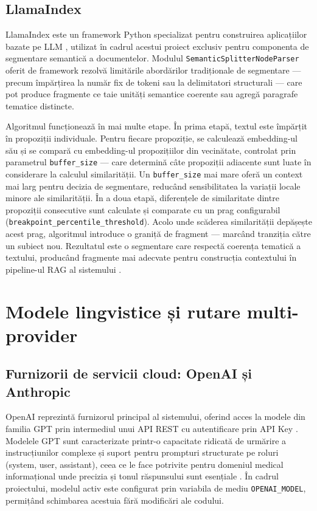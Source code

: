 \documentclass[12pt, a4paper, oneside, romanian]{teza-upb}
\begin{document}
\subsection{LlamaIndex}

LlamaIndex este un framework Python specializat pentru construirea aplicațiilor 
bazate pe LLM \cite{llamaindex_doc}, utilizat în cadrul acestui proiect exclusiv 
pentru componenta de segmentare semantică a documentelor. Modulul 
\texttt{SemanticSplitterNodeParser} oferit de framework rezolvă limitările 
abordărilor tradiționale de segmentare — precum împărțirea la număr fix de 
tokeni sau la delimitatori structurali — care pot produce fragmente ce taie 
unități semantice coerente sau agregă paragrafe tematice distincte.

Algoritmul funcționează în mai multe etape. În prima etapă, textul este împărțit 
în propoziții individuale. Pentru fiecare propoziție, se calculează embedding-ul 
său și se compară cu embedding-ul propozițiilor din vecinătate, controlat prin 
parametrul \texttt{buffer\_size} — care determină câte propoziții adiacente sunt 
luate în considerare la calculul similarității. Un \texttt{buffer\_size} mai mare 
oferă un context mai larg pentru decizia de segmentare, reducând sensibilitatea 
la variații locale minore ale similarității. În a doua etapă, diferențele de 
similaritate dintre propoziții consecutive sunt calculate și comparate cu un prag configurabil (\texttt{breakpoint\_percentile\_threshold}). Acolo unde 
scăderea similarității depășește acest prag, algoritmul introduce o graniță de 
fragment — marcând tranziția către un subiect nou. Rezultatul este o segmentare 
care respectă coerența tematică a textului, producând fragmente mai adecvate 
pentru construcția contextului în pipeline-ul RAG al sistemului \cite{llamaindex_doc}.

\section{Modele lingvistice și rutare multi-provider}


\subsection{Furnizorii de servicii cloud: OpenAI și Anthropic}

OpenAI reprezintă furnizorul principal al sistemului, oferind acces la modele 
din familia GPT prin intermediul unui API REST cu autentificare prin API Key
\cite{openai_api}. Modelele GPT sunt caracterizate printr-o capacitate ridicată 
de urmărire a instrucțiunilor complexe și suport pentru prompturi structurate 
pe roluri (system, user, assistant), ceea ce le face potrivite pentru domeniul 
medical informațional unde precizia și tonul răspunsului sunt esențiale 
\cite{openai_api}. În cadrul proiectului, modelul activ este configurat prin 
variabila de mediu \texttt{OPENAI\_MODEL}, permițând schimbarea acestuia fără 
modificări ale codului.
\end{document}
